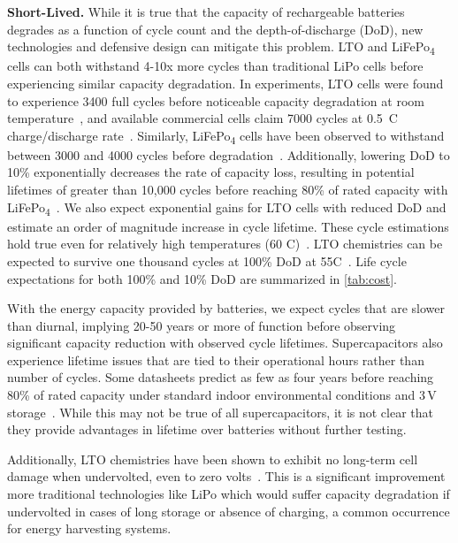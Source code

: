 \vspace{-6pt}
\noindent
\textbf{Short-Lived.}
While it is true that the capacity of rechargeable batteries degrades as a function
of cycle count and the depth-of-discharge (DoD), new technologies and defensive design
can mitigate this problem. LTO and LiFePo\textsubscript{4} cells can both withstand
4-10x more cycles than traditional
LiPo cells before experiencing similar capacity
degradation. In experiments, LTO cells were found to experience 3400 full
cycles before noticeable capacity degradation at room temperature~\cite{hallExperimental18}, and
available commercial cells claim 7000 cycles at 0.5~C charge/discharge
rate~\cite{LTODatasheet2}.
Similarly,
LiFePo\textsubscript{4} cells have been observed to withstand between 3000 and
4000 cycles before degradation~\cite{omarLithium14, wangCycle11,
sarasketaCycle15}.  Additionally, lowering DoD to 10\%
exponentially decreases the rate of capacity loss, resulting in potential
lifetimes of greater than 10,000 cycles before reaching 80\% of rated capacity
with LiFePo\textsubscript{4}~\cite{omarLithium14, wangCycle11}.
We
also expect exponential gains for LTO cells with reduced DoD and estimate an order
of magnitude increase in cycle lifetime.
These cycle estimations hold true even for relatively high temperatures (60\textdegree
C)~\cite{wangCycle11}.
LTO chemistries can be expected to survive one thousand
cycles at 100\% DoD at 55\textdegree C~\cite{han2014cycle}.
Life cycle
expectations for both 100\% and 10\% DoD are summarized in
\cref{tab:cost}.

With the energy capacity provided by batteries, we expect cycles that are
slower than diurnal, implying 20-50 years or more of function before observing
significant capacity reduction with observed cycle lifetimes. Supercapacitors
also experience lifetime issues that are tied to their operational hours rather
than number of cycles.  Some datasheets predict as few as four years before
reaching 80\% of rated capacity under standard indoor environmental conditions
and 3\,V storage~\cite{murataCap}. While this may not be true of all
supercapacitors, it is not clear that they provide advantages in lifetime over
batteries without further testing.

Additionally, LTO chemistries have been shown to exhibit no long-term cell
damage when undervolted, even to zero volts~\cite{brunell2016effect}.
This is a significant improvement more traditional technologies like LiPo which would
suffer capacity degradation if undervolted in cases of long storage or absence
of charging, a common occurrence for energy harvesting systems.
\\

